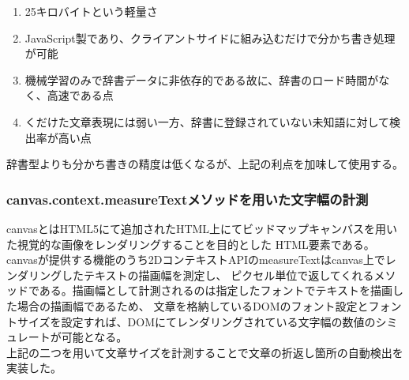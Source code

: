 \begin{enumerate}
	\item 25キロバイトという軽量さ
	\item JavaScript製であり、クライアントサイドに組み込むだけで分かち書き処理が可能
	\item 機械学習のみで辞書データに非依存的である故に、辞書のロード時間がなく、高速である点
	\item くだけた文章表現には弱い一方、辞書に登録されていない未知語に対して検出率が高い点
\end{enumerate}
辞書型よりも分かち書きの精度は低くなるが、上記の利点を加味して使用する。


\subsubsection{canvas.context.measureTextメソッドを用いた文字幅の計測}
canvasとはHTML5にて追加されたHTML上にてビッドマップキャンバスを用いた視覚的な画像をレンダリングすることを目的とした
HTML要素である。canvasが提供する機能のうち2DコンテキストAPIのmeasureTextはcanvas上でレンダリングしたテキストの描画幅を測定し、
ピクセル単位で返してくれるメソッドである。描画幅として計測されるのは指定したフォントでテキストを描画した場合の描画幅であるため、
文章を格納しているDOMのフォント設定とフォントサイズを設定すれば、DOMにてレンダリングされている文字幅の数値のシミュレートが可能となる。
\\上記の二つを用いて文章サイズを計測することで文章の折返し箇所の自動検出を実装した。

